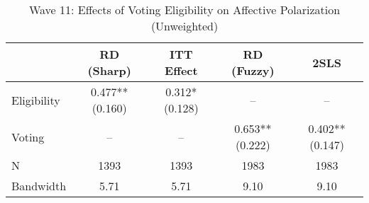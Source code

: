 \begin{table}[htbp]
\centering
\caption{Wave 11: Effects of Voting Eligibility on Affective Polarization (Unweighted)}
\label{tab:wave11_un}
\begin{tabular}{lcccc}
\hline
 & RD (Sharp) & ITT Effect & RD (Fuzzy) & 2SLS \\
\hline
Eligibility & 0.477** (0.160) & 0.312* (0.128) & -- & -- \\
Voting & -- & -- & 0.653** (0.222) & 0.402** (0.147) \\
\hline
N & 1393 & 1393 & 1983 & 1983 \\
Bandwidth & 5.71 & 5.71 & 9.10 & 9.10 \\
\hline
\end{tabular}
\end{table}
